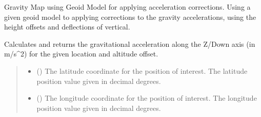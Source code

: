 \documentclass[letterpaper,10pt,english]{sphinxmanual}
\begin{document}
\begin{fulllineitems}
\label{\detokenize{modules/gravity/egm:qnav.gravity.egm.GeoidCorrection}}
\pysigstartsignatures
{}
\pysigstopsignatures
\sphinxAtStartPar
Gravity Map using Geoid Model for applying acceleration corrections.
Using a given geoid model to applying corrections to the gravity
accelerations, using the height offsets and deflections of vertical.

\begin{fulllineitems}
\label{\detokenize{modules/gravity/egm:qnav.gravity.egm.GeoidCorrection.calc_gravity_z}}
\pysigstartsignatures
{}
\pysigstopsignatures
\sphinxAtStartPar
Calculates and returns the gravitational acceleration along the Z/Down
axis (in m/s\textasciicircum{}2) for the given location and altitude offset.
\begin{quote}\begin{description}
\begin{itemize}
\item {} 
\sphinxAtStartPar
{} () \textendash{} The latitude coordinate for the position of interest.
The latitude position value given in decimal degrees.

\item {} 
\sphinxAtStartPar
{} () \textendash{} The longitude coordinate for the position of interest.
The longitude position value given in decimal degrees.


\end{itemize}
\end{description}
\end{quote}
\end{fulllineitems}
\end{fulllineitems}
\end{document}
